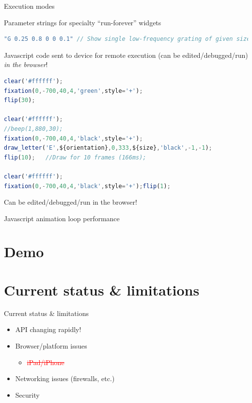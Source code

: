 \documentclass[10pt]{beamer}
\begin{document}
\begin{frame}[fragile]{Execution modes}

Parameter strings for specialty ``run-forever'' widgets
\begin{lstlisting}[language=JavaScript]
"G 0.25 0.8 0 0 0.1" // Show single low-frequency grating of given size, contrast, color, flash rate, etc.
\end{lstlisting}

Javascript code sent to device for remote execution (can be
    edited/debugged/run) \textit{in the browser}!  

\begin{lstlisting}[language=JavaScript]
clear('#ffffff');
fixation(0,-700,40,4,'green',style='+');
flip(30);

clear('#ffffff');
//beep(1,880,30);
fixation(0,-700,40,4,'black',style='+');
draw_letter('E',${orientation},0,333,${size},'black',-1,-1);
flip(10);	//Draw for 10 frames (166ms);

clear('#ffffff');
fixation(0,-700,40,4,'black',style='+');flip(1);
\end{lstlisting}
    Can be edited/debugged/run in the browser!
\end{frame}


\begin{frame}{Javascript animation loop performance}
\end{frame}


\section{Demo}

\section{Current status \& limitations}
\begin{frame}{Current status \& limitations}
    \begin{itemize}[<+->]
		\item API changing rapidly!
		\item Browser/platform issues
	        \begin{itemize}
                \item \textcolor{red}{\sout{iPad/iPhone}}
            \end{itemize}
        \item Networking issues (firewalls, etc.)
        \item Security
    \end{itemize}
\end{frame}
\end{document}
